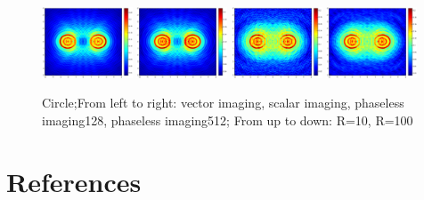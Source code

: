 \documentclass[12pt]{iopart}
\begin{document}
\begin{figure}
	\centering
	\includegraphics[width=0.24\textwidth]{./graphic_phase/bi_circle_r_10_k_4_vector.eps}
	\includegraphics[width=0.24\textwidth]{./graphic_phase/bi_circle_r_10_k_4_scalar.eps}
	\includegraphics[width=0.24\textwidth]{./graphic_phase/bi_circle_r_10_k_4_phaseless_n_128_bias_100.eps}
	\includegraphics[width=0.24\textwidth]{./graphic_phase/bi_circle_r_10_k_4_phaseless_n_512_bias_100.eps}
	
	\caption{Circle;From left to right: vector imaging, scalar imaging, phaseless imaging128, phaseless imaging512; From up to down: R=10, R=100 }\label{figure_bicircle_phaless}
\end{figure}

\section*{References}

\end{document}
